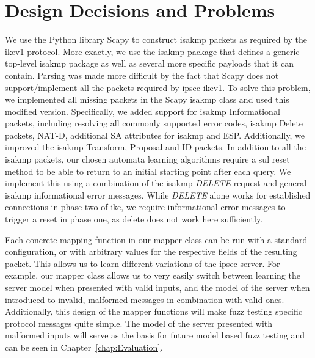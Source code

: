 \section{Design Decisions and Problems} \label{subsec:design}
We use the Python library Scapy to construct \ac{isakmp} packets as required by the \ac{ike}v1 protocol. More exactly, we use the \ac{isakmp} package that defines a generic top-level \ac{isakmp} package as well as several more specific payloads that it can contain. Parsing was made more difficult by the fact that Scapy does not support/implement all the packets required by \ac{ipsec}-\ac{ike}v1. To solve this problem, we implemented all missing packets in the Scapy \ac{isakmp} class and used this modified version. Specifically, we added support for \ac{isakmp} Informational packets, including resolving all commonly supported error codes, \ac{isakmp} Delete packets, NAT-D, additional SA attributes for \ac{isakmp} and ESP. Additionally, we improved the \ac{isakmp} Transform, Proposal and ID packets. In addition to all the \ac{isakmp} packets, our chosen automata learning algorithms require a \ac{sul} reset method to be able to return to an initial starting point after each query. We implement this using a combination of the \ac{isakmp} \emph{DELETE} request and general \ac{isakmp} informational error messages. While \emph{DELETE} alone works for established connections in phase two of \ac{ike}, we require informational error messages to trigger a reset in phase one, as delete does not work here sufficiently.

Each concrete mapping function in our mapper class can be run with a standard configuration, or with arbitrary values for the respective fields of the resulting packet. This allows us to learn different variations of the \ac{ipsec} server. For example, our mapper class allows us to very easily switch between learning the server model when presented with valid inputs, and the model of the server when introduced to invalid, malformed messages in combination with valid ones. Additionally, this design of the mapper functions will make fuzz testing specific protocol messages quite simple. The model of the server presented with malformed inputs will serve as the basis for future model based fuzz testing and can be seen in Chapter~\ref{chap:Evaluation}.

